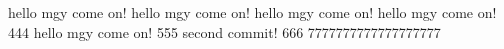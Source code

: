 hello mgy  come on!
hello mgy  come on!
hello mgy  come on!
hello mgy  come on! 444
hello mgy  come on! 555
second commit!  666
7777777777777777777
